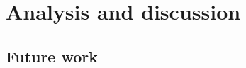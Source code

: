 \documentclass[12pt, a4paper]{article}
\begin{document}




\section{Analysis and discussion}
\label{Analysis}





\subsection{Future work}








\pagebreak


\end{document}
